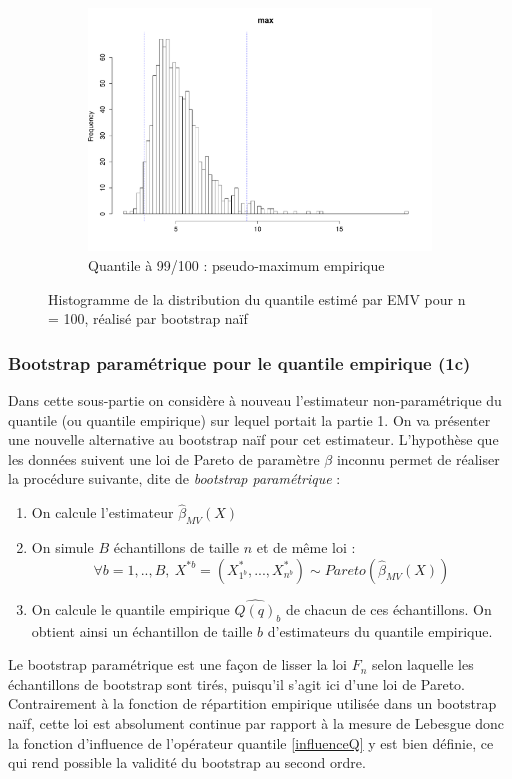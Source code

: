 \documentclass{article}
\renewcommand*{\(}{ \left( }
\renewcommand*{\)}{ \right) }
\begin{document}
\begin{figure}[H]
\begin{subfigure}[t]{0.3\textwidth}
        \includegraphics[width = \linewidth]{img/BootstrapAEMV-Max-100.pdf}
        \caption{Quantile à 99/100 : pseudo-maximum empirique}
        \label{fig:BAEMVMaxb}
    \end{subfigure}%
    \caption{Histogramme de la distribution du quantile estimé par EMV pour n = 100, réalisé par bootstrap naïf}
    \label{fig:BAEMVb}
\end{figure}

\subsubsection{Bootstrap paramétrique pour le quantile empirique (1c)}
Dans cette sous-partie on considère à nouveau l'estimateur non-paramétrique du quantile (ou quantile empirique) sur lequel portait la partie 1. On va présenter une nouvelle alternative au bootstrap naïf pour cet estimateur.
L'hypothèse que les données suivent une loi de Pareto de paramètre $\beta$ inconnu permet de réaliser la procédure suivante, dite de \emph{bootstrap paramétrique} :
\begin{enumerate}
\item On calcule l'estimateur $\widehat{\beta}_{MV}(X)$
\item On simule $B$ échantillons de taille $n$ et de même loi : 
\[\forall b = 1,..,B, \ X^{*b} = (X^*_{1^b}, ..., X^*_{n^b}) \sim Pareto(\widehat{\beta}_{MV}(X)) \]
\item On calcule le quantile empirique $\widehat{Q(q)}_b$ de chacun de ces échantillons. On obtient ainsi un échantillon de taille $b$ d'estimateurs du quantile empirique. 
\end{enumerate}
Le bootstrap paramétrique est une façon de lisser la loi $F_n$ selon laquelle les échantillons de bootstrap sont tirés, puisqu'il s'agit ici d'une loi de Pareto. Contrairement à la fonction de répartition empirique utilisée dans un bootstrap naïf, cette loi est absolument continue par rapport à la mesure de Lebesgue donc la fonction d'influence de l'opérateur quantile \eqref{influenceQ} y est bien définie, ce qui rend possible la validité du bootstrap au second ordre. \\ 
\end{document}
